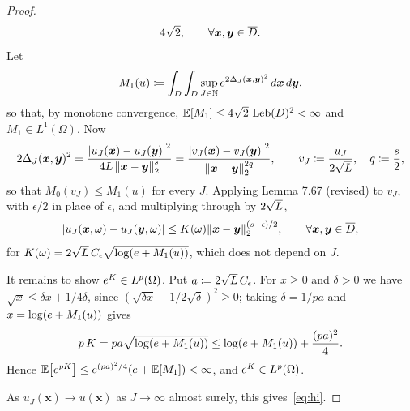 \documentclass[final]{article}
\theoremstyle{definition}
\newcommand{\vecbs}[1]{\boldsymbol{#1}}
\renewcommand{\vec}[1]{{\vecbs{#1}}}
\begin{document}
\begin{enumerate}
\begin{description}
\begin{proof}
\[  4\tsqrt{2},\qquad \forall  \vec x,\vec y\in {\Dbar}.
  \]
 Let
  \[
  M_1(u)\coloneq \int_D\int_D \sup_{J\in\naturals}
  \erm^{2 \Delta_J(\vec x, \vec y)^2} \,d\vec x \, d\vec y,%
  \]
  so that, by monotone convergence, $\mean{M_1}\le 4\tsqrt2\,\leb(D)^2<\infty$
  and $M_1\in {L}^1(\Omega)$.  Now
  \[
  2\Delta_J(\vec x,\vec y)^2%
  =\frac{\abs{u_J(\vec x)-u_J(\vec y)}^2}{4L\,\enorm{\vec x-\vec y}^{s}}%
  =\frac{\abs{v_J(\vec x)-v_J(\vec y)}^2}{\enorm{\vec x-\vec y}^{2q}},
  \qquad v_J\coloneq \frac{u_J}{2\tsqrt L},\quad q\coloneq \frac s2,
  \]
  so that $M_0(v_J)\le M_1(u)$ for every $J$.  Applying Lemma 7.67 (revised) to
  $v_J$, with $\epsilon/2$ in place of $\epsilon$, and multiplying through by
  $2\sqrt L$,
  \[
 \abs{u_J(\vec x,\omega)-u_J(\vec
    y,\omega)}%
  \le K(\omega)\enorm{\vec x-\vec y}^{(s-\epsilon)/2},\qquad
  \forall \vec x,\vec y\in {\Dbar},
  \]
  for $K(\omega)=2\tsqrt{L}\,C_\epsilon\sqrt{\log\pp{\erm+M_1(u)}}$, which does
  not depend on $J$.

  It remains to show ${e}^K\in L^p(\Omega)$.  Put $a\coloneq2\sqrt
  L\,C_\epsilon$.  For $x\ge0$ and $\delta>0$ we have $\sqrt x\le \delta x
  +1/4\delta$, since $(\sqrt{\delta x}-1/2\sqrt\delta)^2\ge0$; taking
  $\delta=1/pa$ and $x=\log\pp{\erm+M_1(u)}$ gives
  \[
  p\,K = pa\sqrt{\log\pp{\erm+M_1(u)}}%
  \le \log\pp{\erm+M_1(u)} + \frac{(pa)^2}{4}.
  \]
  Hence $\mean{\erm^{pK}}\le \erm^{(pa)^2/4}\pp{\erm+\mean{M_1}}<\infty$, and
  ${e}^K\in L^p(\Omega)$.

  As $u_J(\vec x)\to u(\vec x)$ as $J\to\infty$ almost surely,
  this gives~\eqref{eq:hi}.
\end{proof}


\end{description}
\end{enumerate}
\end{document}
